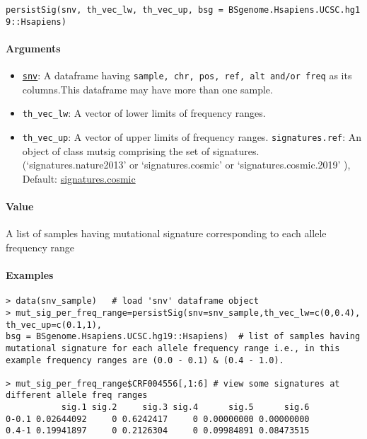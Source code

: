 \documentclass[]{article}
\providecommand{\tightlist}{%
  \setlength{\itemsep}{0pt}\setlength{\parskip}{0pt}}
\let\oldparagraph\paragraph
\renewcommand{\paragraph}[1]{\oldparagraph{#1}\mbox{}}
\begin{document}
\texttt{persistSig(snv,\ th\_vec\_lw,\ th\_vec\_up,\ bsg\ =\ BSgenome.Hsapiens.UCSC.hg19::Hsapiens)}

\paragraph{\texorpdfstring{\textbf{Arguments
}}{Arguments }}\label{arguments-10}

\begin{itemize}
\tightlist
\item
  \protect\hyperlink{vcfToSNV}{\texttt{snv}}: A dataframe having
  \texttt{sample,\ chr,\ pos,\ ref,\ alt\ and/or\ freq} as its
  columns.This dataframe may have more than one sample.
\item
  \texttt{th\_vec\_lw}: A vector of lower limits of frequency ranges.
\item
  \texttt{th\_vec\_up}: A vector of upper limits of frequency ranges.
  \texttt{signatures.ref}: An object of class mutsig comprising the set of signatures. (`signatures.nature2013' or `signatures.cosmic' or `signatures.cosmic.2019' ), Default: \href{https://cran.r-project.org/web/packages/deconstructSigs/deconstructSigs.pdf}{signatures.cosmic} 
\end{itemize}

\paragraph{\texorpdfstring{\textbf{Value}}{Value}}\label{value-9}

A list of samples having mutational signature corresponding to each allele frequency range

\paragraph{\texorpdfstring{\textbf{Examples}}{Examples}}\label{examples-11}

\begin{verbatim}
> data(snv_sample)   # load 'snv' dataframe object
> mut_sig_per_freq_range=persistSig(snv=snv_sample,th_vec_lw=c(0,0.4), th_vec_up=c(0.1,1), 
bsg = BSgenome.Hsapiens.UCSC.hg19::Hsapiens)  # list of samples having mutational signature for each allele frequency range i.e., in this example frequency ranges are (0.0 - 0.1) & (0.4 - 1.0).

> mut_sig_per_freq_range$CRF004556[,1:6] # view some signatures at different allele freq ranges
           sig.1 sig.2     sig.3 sig.4      sig.5      sig.6
0-0.1 0.02644092     0 0.6242417     0 0.00000000 0.00000000
0.4-1 0.19941897     0 0.2126304     0 0.09984891 0.08473515
\end{verbatim}
\end{document}
